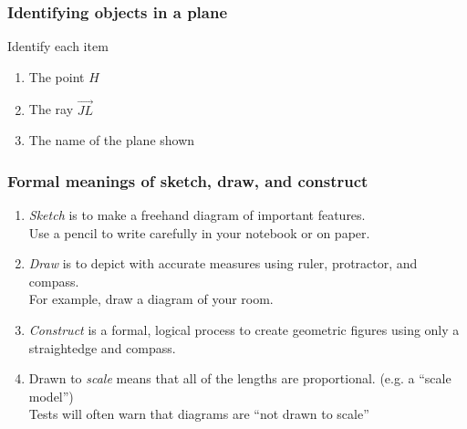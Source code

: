 \documentclass{beamer}
\begin{document}
\frame
{
  \frametitle{Identifying objects in a plane}
  Identify each item
  \begin{enumerate} 
    \item The point $H$
    \item The ray $\overrightarrow{JL}$
    \item The name of the plane shown
    \end{enumerate} \vspace{1cm}
    \begin{center}
  \end{center}
}

\frame
{
  \frametitle{Formal meanings of sketch, draw, and construct}
  \begin{enumerate}
    \item \emph{Sketch} is to make a freehand diagram of important features. \\[0.15cm]
    Use a pencil to write carefully in your notebook or on paper.  \smallskip
    \item \emph{Draw}  is to depict with accurate measures using ruler, protractor, and compass.\\[0.15cm]
    For example, draw a diagram of your room. \smallskip
    \item \emph{Construct} is a formal, logical process to create geometric figures using only a straightedge and compass. \smallskip
    \item Drawn to \emph{scale} means that all of the lengths are proportional. (e.g. a ``scale model'')\\[0.15cm]
    Tests will often warn that diagrams are ``not drawn to scale''
  \end{enumerate}
}
\end{document}
